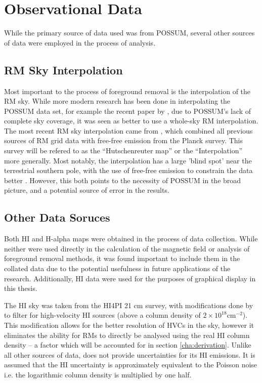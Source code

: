 \section{Observational Data}
\label{sec:data}

While the primary source of data used was from POSSUM, several other sources of data were employed in the process of analysis.

\subsection{RM Sky Interpolation}
\label{ssec:legacy}

Most important to the process of foreground removal is the interpolation of the RM sky. While more modern research has been done in interpolating the POSSUM data set, for example the recent paper by \cite{ID58}, due to POSSUM's lack of complete sky coverage, it was seen as better to use a whole-sky RM interpolation. The most recent RM sky interpolation came from \cite{ID44, ID45}, which combined all previous sources of RM grid data with free-free emission from the Planck survey. This survey will be refered to as the “Hutschenreuter map” or the “Interpolation” more generally. Most notably, the interpolation has a large 'blind spot' near the terrestrial southern pole, with the use of free-free emission to constrain the data better \citep{ID44, ID45}. However, this both points to the necessity of POSSUM in the broad picture, and a potential source of error in the results.

\subsection{Other Data Soruces}
\label{ssec:other_data}

Both HI and H-alpha maps were obtained in the process of data collection. While neither were used directly in the calculation of the magnetic field or analysis of foreground removal methods, it was found important to include them in the collated data due to the potential usefulness in future applications of the research. Additionally, HI data were used for the purposes of graphical display in this thesis.


The HI sky was taken from the HI4PI 21 cm survey, with modifications done by \cite{ID6} to filter for high-velocity HI sources (above a column density of $2\times 10^{18} \mathrm{cm}^{-2}$). This modification allows for the better resolution of HVCs in the sky, however it eliminates the ability for RMs to directly be analysed using the real HI column density – a factor which will be accounted for in section \ref{cha:derivation}. Unlike all other sources of data, \cite{ID6} does not provide uncertainties for its HI emissions. It is assumed that the HI uncertainty is approximately equivalent to the Poisson noise i.e. the logarithmic column density is multiplied by one half.


